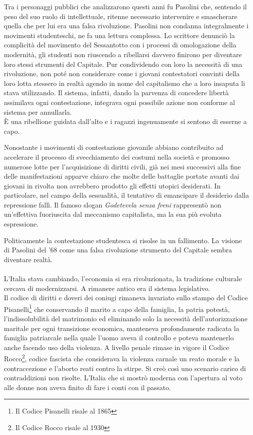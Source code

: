 Tra i personaggi pubblici che analizzarono questi anni fu Pasolini che, sentendo il peso del suo ruolo di intellettuale, ritenne necessario intervenire e smascherare quella che per lui era una falsa rivoluzione.
Pasolini non condanna integralmente i movimenti studenteschi, ne fa una lettura complessa.
Lo scrittore denunciò la complicità del movimento del Sessantotto con i processi di omologazione della modernità, gli studenti non riuscendo a ribellarsi davvero finirono per diventare loro stessi strumenti del Capitale.
Pur condividendo con loro  la necessità di una rivoluzione, non poté non considerare come i giovani contestatori convinti della loro lotta stessero in realtà agendo in nome del capitalismo che a loro insaputa li stava utilizzando.
Il sistema, infatti, dando la parvenza di concedere libertà assimilava ogni contestazione, integrava ogni possibile azione non conforme al sistema per annullarla.
\\È una ribellione guidata dall'alto e i ragazzi ingenuamente si sentono di esserne a capo.

Nonostante i movimenti di contestazione giovanile abbiano contribuito ad accelerare il processo di svecchiamento dei costumi nella società e promosso numerose lotte per l’acquisizione di diritti civili, già nei mesi successivi alla fine delle manifestazioni apparve chiaro che molte delle battaglie portate avanti dai giovani in rivolta non avrebbero prodotto gli effetti utopici desiderati.
In particolare, nel campo della sessualità, il tentativo di emancipare il desiderio dalla repressione fallì.
Il famoso slogan \textit{Godetevela senza freni} rappresentò non un’effettiva fuoriuscita dal meccanismo capitalista, ma la sua più evoluta espressione.

Politicamente la contestazione studentesca si risolse in un fallimento.
La visione di Pasolini del '68 come una falsa rivoluzione strumento del Capitale sembra diventare realtà.

\paragraph{} L'Italia stava cambiando, l'economia si era rivoluzionata, la tradizione culturale cercava di modernizzarsi.
A rimanere antico era il sistema legislativo.
\\Il codice di diritti e doveri dei coniugi rimaneva invariato sullo stampo del Codice Pisanelli\footnote{Il Codice Pisanelli risale al 1865} che conservando il marito a capo della famiglia, la patria potestà, l'indissolubilità del matrimonio ed eliminando solo la necessità dell'autorizzazione maritale per ogni transizione economica, manteneva profondamente radicata la famiglia patriarcale nella quale l'uomo aveva il controllo e poteva mantenerlo anche facendo uso della violenza.
A livello penale rimase in vigore il Codice Rocco\footnote{Il Codice Rocco risale al 1930}, codice fascista che considerava la violenza carnale un reato morale e la contraccezione e l'aborto reati contro la stirpe.
Si creò così uno scenario carico di contraddizioni non risolte.
L'Italia che si mostrò moderna con l'apertura al voto alle donne non aveva finito di fare i conti con il passato.

